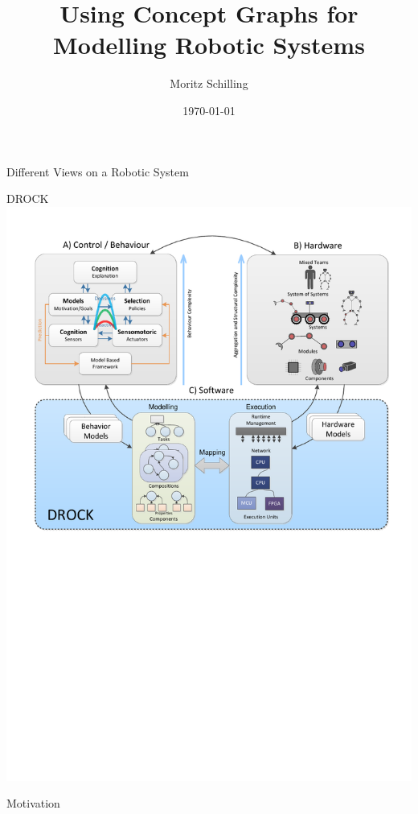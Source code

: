 \documentclass[pdf]
{beamer}
\title[ESTEC 2017]
{
    \textbf{Using Concept Graphs for Modelling Robotic Systems}
}
\author{Moritz Schilling}
\date{\today}
\begin{document}
\begin{frame}[plain]
    \titlepage
\end{frame}


\begin{frame}{Different Views on a Robotic System}
\end{frame}
\begin{frame}{DROCK}
    \centering
    \includegraphics[width=.9\textwidth]{pics/circle.pdf}
\end{frame}

\begin{frame}{Motivation}
	\centering
	
\end{frame}
\end{document}
